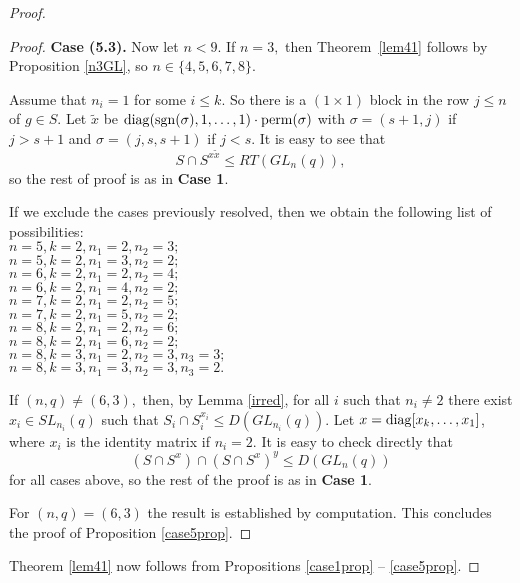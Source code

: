 \begin{proof}
\begin{proof}
\medskip

{\bf Case (5.3).}  Now let $n<9.$ If $n=3,$ then Theorem~\ref{lem41} follows by Proposition \ref{n3GL}, so $n \in \{4,5,6,7,8\}$.

Assume that $n_i=1$ for some $i\le k$. So there is a $(1\times 1)$ block in the row $j \le n$ of $g \in S$. Let $\tilde{x}$ be $\mathrm{diag}(\mathrm{sgn}(\sigma), 1, \ldots, 1) \cdot \mathrm{perm}(\sigma)$ with $\sigma=(s+1,j)$ if $j>s+1$ and  $\sigma=(j,s,s+1)$ if $j<s.$ It is easy to see that 
$$S \cap S^{x \tilde x}\le RT(GL_n(q)),$$
so the rest of proof is  as in {\bf Case 1}.

If we exclude the cases previously resolved, then we obtain the following list of possibilities:\medskip\\
$n=5, k=2, n_1=2, n_2=3;$\\
$n=5, k=2, n_1=3, n_2=2;$\\
$n=6, k=2, n_1=2, n_2=4;$\\
$n=6, k=2, n_1=4, n_2=2;$\\
$n=7, k=2, n_1=2, n_2=5;$\\
$n=7, k=2, n_1=5, n_2=2;$\\
$n=8, k=2, n_1=2, n_2=6;$\\
$n=8, k=2, n_1=6, n_2=2;$\\
$n=8, k=3, n_1=2, n_2=3, n_3=3;$\\
$n=8, k=3, n_1=3, n_2=3, n_3=2.$
\medskip

If $(n,q) \ne (6,3),$ then, by Lemma \ref{irred}, for all $i$ such that $n_i\ne 2$  there exist $x_i \in SL_{n_i}(q)$ such that $S_i \cap S_i^{x_i} \le D(GL_{n_i}(q))$. Let $x=\mathrm{diag}[x_k, \ldots, x_1]$, where $x_i$ is the identity matrix  if $n_i=2$. It is easy to check directly that $$(S \cap S^x) \cap (S \cap S^x)^y \le D(GL_n(q))$$
for all cases above, so the rest of the proof is  as in {\bf Case 1}.

  For $(n,q)=(6,3)$ the result is established by computation. This concludes the proof of Proposition \ref{case5prop}.
\end{proof}
  
 Theorem \ref{lem41}  now follows from     Propositions \ref{case1prop} -- \ref{case5prop}.
\end{proof}


